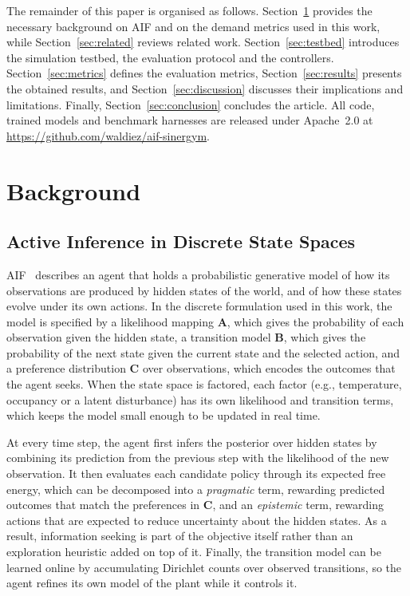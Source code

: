 \documentclass[conference]{IEEEtran}
\begin{document}
The remainder of this paper is organised as follows. Section~\ref{sec:background}
provides the necessary background on AIF and on the demand
metrics used in this work, while Section~\ref{sec:related} reviews related
work. Section~\ref{sec:testbed} introduces the simulation testbed, the evaluation
protocol and the controllers. Section~\ref{sec:metrics} defines the evaluation
metrics, Section~\ref{sec:results} presents the obtained results, and
Section~\ref{sec:discussion} discusses their implications and limitations.
Finally, Section~\ref{sec:conclusion} concludes the article. All code, trained models and
benchmark harnesses are released under Apache~2.0 at
\url{https://github.com/waldiez/aif-sinergym}.

\section{Background}
\label{sec:background}

\subsection{Active Inference in Discrete State Spaces}

AIF~\cite{friston2017} describes an agent that holds a
probabilistic generative model of how its observations are produced by hidden
states of the world, and of how these states evolve under its own actions. In
the discrete formulation used in this work, the model is specified by a
likelihood mapping $\mathbf{A}$, which gives the probability of each
observation given the hidden state, a transition model $\mathbf{B}$, which
gives the probability of the next state given the current state and the
selected action, and a preference distribution $\mathbf{C}$ over observations,
which encodes the outcomes that the agent seeks. When the state space is
factored, each factor (e.g., temperature, occupancy or a latent disturbance)
has its own likelihood and transition terms, which keeps the model small
enough to be updated in real time.

At every time step, the agent first infers the posterior over hidden states by
combining its prediction from the previous step with the likelihood of the new
observation. It then evaluates each candidate policy through its expected free
energy, which can be decomposed into a \emph{pragmatic} term, rewarding
predicted outcomes that match the preferences in $\mathbf{C}$, and an
\emph{epistemic} term, rewarding actions that are expected to reduce
uncertainty about the hidden states. As a result, information seeking is part
of the objective itself rather than an exploration heuristic added on top of
it. Finally, the transition model can be learned online by accumulating
Dirichlet counts over observed transitions, so the agent refines its own model
of the plant while it controls it.
\end{document}
